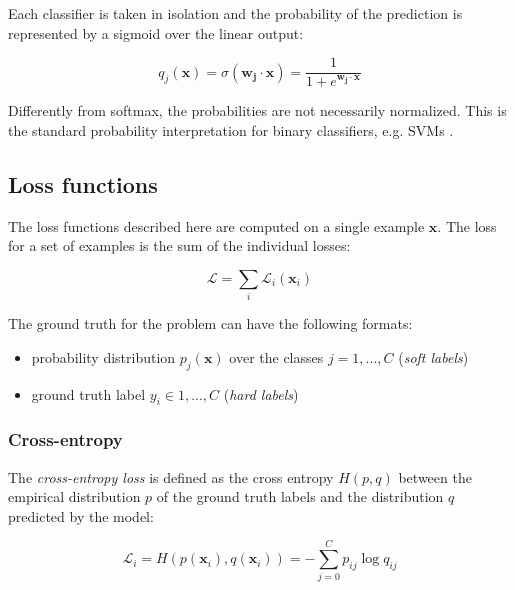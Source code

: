 \documentclass{article}
\begin{document}
Each classifier is taken in isolation and the probability of the prediction is
represented by a sigmoid over the linear output:

\begin{equation*}
q_j(\mathbf{x}) = \sigma(\mathbf{w_j} \cdot \mathbf{x}) = \frac{1}{1 + 
  e^{\mathbf{w_j} \cdot \mathbf{x}} }
\end{equation*}

Differently from softmax, the probabilities are not necessarily normalized. This
is the standard probability interpretation for binary classifiers, e.g. SVMs
\cite{Platt1999}.


\subsection{Loss functions}

The loss functions described here are computed on a single example $\mathbf{x}$.
The loss for a set of examples is the sum of the individual losses:

\begin{equation*}
\mathcal{L} = \sum_{i} \mathcal{L}_i(\mathbf{x}_i)
\end{equation*}

The ground truth for the problem can have the following formats:

\begin{itemize}

\item probability distribution $p_j(\mathbf{x})$ over the classes $j = 1, ..., C$
(\emph{soft labels})

\item ground truth label $y_i \in {1, ..., C}$ (\emph{hard labels})

\end{itemize}


\subsubsection{Cross-entropy}

The \emph{cross-entropy loss} is defined as the cross entropy $H(p,q)$ between
the empirical distribution $p$ of the ground truth labels and the distribution
$q$ predicted by the model:

\begin{equation*}
\mathcal{L}_i = H(p(\mathbf{x}_i), q(\mathbf{x}_i)) = 
  -\sum_{j=0}^{C} p_{ij} \log q_{ij}
\end{equation*}
\end{document}
